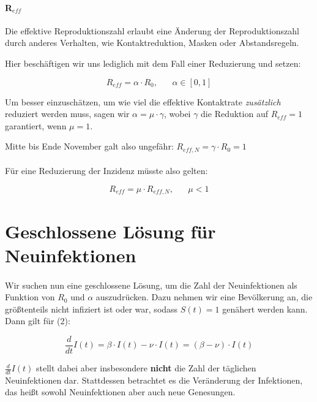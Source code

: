 \documentclass[a4paper]{article}
\begin{document}
    \paragraph{R$_{eff}$} Die effektive Reproduktionszahl erlaubt eine Änderung der Reproduktionszahl durch anderes Verhalten, wie Kontaktreduktion, Masken oder Abstandsregeln. 

    Hier beschäftigen wir uns lediglich mit dem Fall einer Reduzierung und setzen: 

    \begin{equation}
        R_{eff} = \alpha \cdot R_0, \;\;\;\;\;\; \alpha \in [0, 1]
    \end{equation}

    Um besser einzuschätzen, um wie viel die effektive Kontaktrate \textit{zusätzlich} reduziert werden muss, sagen wir $\alpha=\mu \cdot \gamma$, wobei $\gamma$ die Reduktion auf $R_{eff}=1$ garantiert, wenn $\mu=1$. 

    Mitte bis Ende November galt also ungefähr: $ R_{eff,N} = \gamma \cdot R_0 = 1 $

    \paragraph{}Für eine Reduzierung der Inzidenz müsste also gelten: 
    
    $$R_{eff} = \mu \cdot R_{eff,N}, \;\;\;\;\;\; \mu < 1$$

    \section{Geschlossene Lösung für Neuinfektionen}
    \paragraph{}Wir suchen nun eine geschlossene Lösung, um die Zahl der Neuinfektionen als Funktion von $R_0$ und $\alpha$ auszudrücken. Dazu nehmen wir eine Bevölkerung an, die größtenteils nicht infiziert ist oder war, sodass $S(t)=1$ genähert werden kann. Dann gilt für (2):

    $$ \frac{d}{dt}I(t) = \beta \cdot I(t) - \nu \cdot I(t) = (\beta - \nu) \cdot I(t) $$

    $\frac{d}{dt}I(t)$ stellt dabei aber insbesondere \textbf{nicht} die Zahl der täglichen Neuinfektionen dar. Stattdessen betrachtet es die Veränderung der Infektionen, das heißt sowohl Neuinfektionen aber auch neue Genesungen. 
\end{document}
